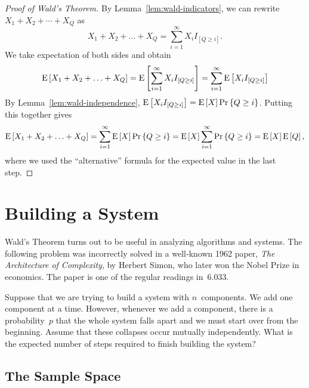 \documentclass[11pt,twoside]{article}
\begin{document}
\begin{proof}[Proof of Wald's Theorem]
  By Lemma~\ref{lem:wald-indicators}, we can rewrite $X_1 + X_2 +
  \cdots + X_Q$ as
  \begin{displaymath}
    X_1 + X_2 + \ldots + X_Q = \sum_{i=1}^{\infty} X_i I_{[Q \geq i]}.
  \end{displaymath}
  We take expectation of both sides and obtain
  \begin{displaymath}
    \mathop{\textup{E}}\nolimits\left[X_1 + X_2 + \ldots + X_Q\right]
    =
    \mathop{\textup{E}}\nolimits\left[\sum_{i=1}^{\infty} X_i I_{[Q \geq i]}\right]
    =
    \sum_{i=1}^{\infty} \mathop{\textup{E}}\nolimits\left[X_i I_{[Q \geq i]}\right]
  \end{displaymath}
  By Lemma~\ref{lem:wald-independence}, $\mathop{\textup{E}}\nolimits\left[X_i I_{[Q \geq i]}\right] =
  \mathop{\textup{E}}\nolimits\left[X\right] \mathop{\textup{Pr}}\nolimits\left\{Q \geq i\right\}$. Putting this together gives
  \begin{displaymath}
    \mathop{\textup{E}}\nolimits\left[X_1 + X_2 + \ldots + X_Q\right]
    =
    \sum_{i=1}^{\infty} \mathop{\textup{E}}\nolimits\left[X\right] \mathop{\textup{Pr}}\nolimits\left\{Q \geq i\right\}
    =
    \mathop{\textup{E}}\nolimits\left[X\right] \sum_{i=1}^{\infty} \mathop{\textup{Pr}}\nolimits\left\{Q \geq i\right\}
    =
    \mathop{\textup{E}}\nolimits\left[X\right] \mathop{\textup{E}}\nolimits\left[Q\right],
  \end{displaymath}
  where we used the ``alternative'' formula for the expected value in
  the last step.
\end{proof}
\fi


\section{Building a System}

Wald's Theorem turns out to be useful in analyzing algorithms and
systems.  The following problem was incorrectly solved in a well-known
1962 paper, \emph{The Architecture of Complexity}, by Herbert Simon,
who later won the Nobel Prize in economics.  The paper is one of the
regular readings in~6.033.

Suppose that we are trying to build a system with $n$~components.  We
add one component at a time.  However, whenever we add a component,
there is a probability~$p$ that the whole system falls apart and we
must start over from the beginning.  Assume that these collapses occur
mutually independently.  What is the expected number of steps required
to finish building the system?

\subsection{The Sample Space}
\end{document}
